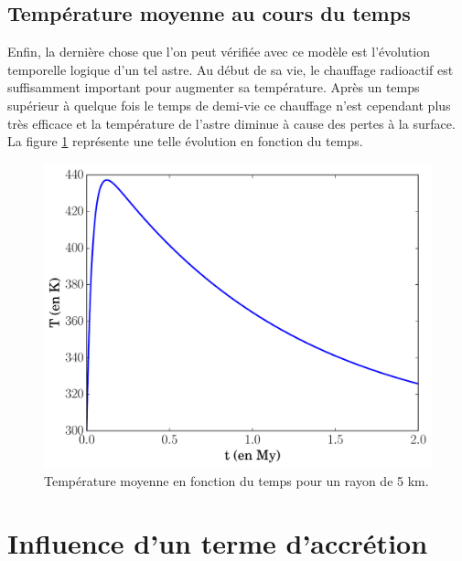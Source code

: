 \documentclass[10pt,a4paper]{article}
\numberwithin{equation}{section}
\begin{document}
\subsection{Température moyenne au cours du temps}
Enfin, la dernière chose que l'on peut vérifiée avec ce modèle est l'évolution temporelle logique d'un tel astre. Au début de sa vie, le chauffage radioactif est suffisamment important pour augmenter sa température. Après un temps supérieur à quelque fois le temps de demi-vie ce chauffage n'est cependant plus très efficace et la température de l'astre diminue à cause des pertes à la surface. La figure \ref{tempMoy} représente une telle évolution en fonction du temps.
\begin{figure}[h]
    \centering	    
	\includegraphics[scale=0.5]{figures/tempMoy.pdf}
    \caption{Température moyenne en fonction du temps pour un rayon de 5 km.}
    	\label{tempMoy} 
\end{figure}

\newpage
\section{Influence d'un terme d'accrétion}
\end{document}
